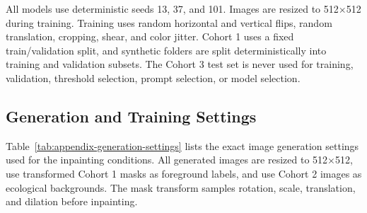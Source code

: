 \documentclass{article}
\begin{document}
All models use deterministic seeds 13, 37, and 101. Images are resized to 512$\times$512 during training. Training uses random horizontal and vertical flips, random translation, cropping, shear, and color jitter. Cohort 1 uses a fixed train/validation split, and synthetic folders are split deterministically into training and validation subsets. The Cohort 3 test set is never used for training, validation, threshold selection, prompt selection, or model selection.

\subsection{Generation and Training Settings}

Table~\ref{tab:appendix-generation-settings} lists the exact image generation settings used for the inpainting conditions. All generated images are resized to 512$\times$512, use transformed Cohort 1 masks as foreground labels, and use Cohort 2 images as ecological backgrounds. The mask transform samples rotation, scale, translation, and dilation before inpainting.
\end{document}
